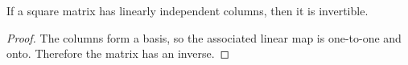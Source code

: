 \begin{theorem}
If a square matrix has linearly independent columns, then it is invertible.
\end{theorem}

\begin{proof}
The columns form a basis, so the associated linear map is one-to-one and onto.
Therefore the matrix has an inverse.
\end{proof}
